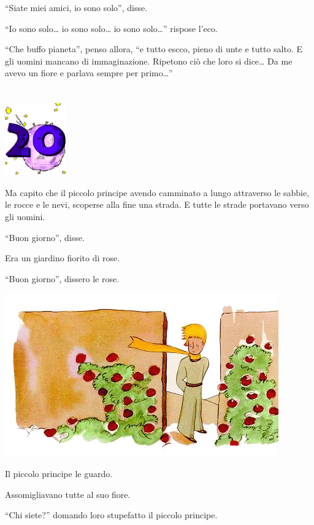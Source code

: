 \documentclass[11pt]{scrbook}
\begin{document}
``Siate miei amici, io sono solo'', disse.

``Io sono solo\ldots{} io sono solo\ldots{} io sono solo\ldots{}''
rispose l'eco.

``Che buffo pianeta'', penso allora, ``e tutto escco, pieno di unte e
tutto salto. E gli uomini mancano di immaginazione. Ripetono ciò che
loro si dice\ldots{} Da me avevo un fiore e parlava sempre per
primo\ldots{}''

\chapter{}
\begin{center}
\includegraphics{img/chapter20}
\end{center}

Ma capito che il piccolo principe avendo camminato a lungo attraverso le
sabbie, le rocce e le nevi, scoperse alla fine una strada. E tutte le
strade portavano verso gli uomini.

``Buon giorno'', disse.

Era un giardino fiorito di rose.

``Buon giorno'', dissero le rose.

\begin{center}
\includegraphics{img/20a}
\end{center}

Il piccolo principe le guardo.

Assomigliavano tutte al suo fiore.

``Chi siete?'' domando loro stupefatto il piccolo principe.
\end{document}
